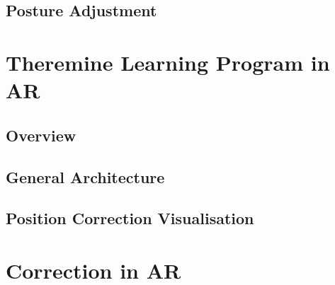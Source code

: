 \subsection{Posture Adjustment}



\section{Theremine Learning Program in AR}

\subsection{Overview}


\subsection{General Architecture}


\subsection{Position Correction Visualisation}



\section{Correction in AR}







